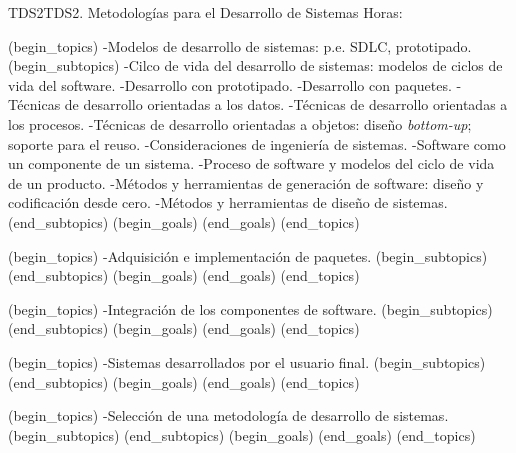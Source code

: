 \begin{BKL2}{TDS2}{TDS2. Metodologías para el Desarrollo de Sistemas}
Horas:
 
(begin_topics)
-Modelos de desarrollo de sistemas: p.e. SDLC, prototipado.
(begin_subtopics)
-Cilco de vida del desarrollo de sistemas: modelos de ciclos de vida del software.
-Desarrollo con prototipado.
-Desarrollo con paquetes.
-Técnicas de desarrollo orientadas a los datos.
-Técnicas de desarrollo orientadas a los procesos.
-Técnicas de desarrollo orientadas a objetos: diseño {\it bottom-up}; soporte para el reuso.
-Consideraciones de ingeniería de sistemas.
-Software como un componente de un sistema.
-Proceso de software y modelos del ciclo de vida de un producto.
-Métodos y herramientas de generación de software: diseño y codificación desde cero.
-Métodos y herramientas de diseño de sistemas.
(end_subtopics)
(begin_goals)
(end_goals)
(end_topics)

 
(begin_topics)
-Adquisición e implementación de paquetes.
(begin_subtopics)
(end_subtopics)
(begin_goals)
(end_goals)
(end_topics)

 
(begin_topics)
-Integración de los componentes de software.
(begin_subtopics)
(end_subtopics)
(begin_goals)
(end_goals)
(end_topics)

 
(begin_topics)
-Sistemas desarrollados por el usuario final.
(begin_subtopics)
(end_subtopics)
(begin_goals)
(end_goals)
(end_topics)

 
(begin_topics)
-Selección de una metodología de desarrollo de sistemas.
(begin_subtopics)
(end_subtopics)
(begin_goals)
(end_goals)
(end_topics)

\end{BKL2}



